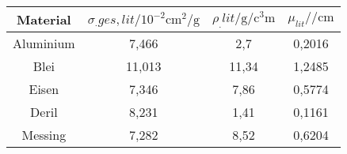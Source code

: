 
	\begin{tabular}{cS[table-format=2.3]S[table-format=2.2]S[table-format=1.4]}
		\toprule
		{Material} & {$\sigma_.{ges,lit}/10^{-2}\si{\centi\metre\squared\per\gram}$} & {$\rho_.{lit}/\si{\gram\per\cubic\centi\metre}$} & {$\mu_{lit}/\si{\per\centi\metre}$} \\
		\midrule
		{Aluminium}	& 7,466 	& 2,7 	& 0,2016 \\
		{Blei}     	& 11,013 	& 11,34	& 1,2485 \\
		{Eisen}	 	& 7,346 	& 7,86 	& 0,5774 \\
		{Deril}	 	& 8,231 	& 1,41 	& 0,1161 \\
		{Messing}	& 7,282 	& 8,52 	& 0,6204 \\
		\bottomrule
	\end{tabular}
